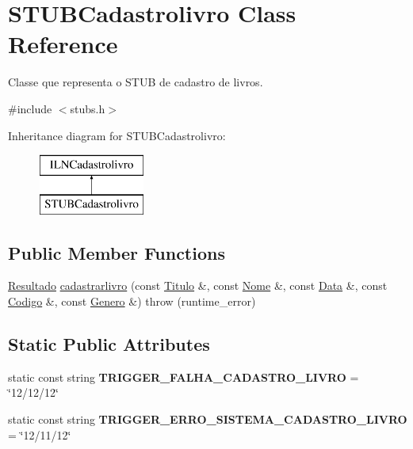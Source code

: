 \hypertarget{classSTUBCadastrolivro}{}\section{S\+T\+U\+B\+Cadastrolivro Class Reference}
\label{classSTUBCadastrolivro}


Classe que representa o S\+T\+UB de cadastro de livros.  




{\ttfamily \#include $<$stubs.\+h$>$}

Inheritance diagram for S\+T\+U\+B\+Cadastrolivro\+:\begin{figure}[H]
\begin{center}
\leavevmode
\includegraphics[height=2.000000cm]{classSTUBCadastrolivro}
\end{center}
\end{figure}
\subsection*{Public Member Functions}
\begin{DoxyCompactItemize}
\item 
\hyperlink{classResultado}{Resultado} \hyperlink{classSTUBCadastrolivro_ae0ef9f6f0a4ea7c397285b4a609bf07b}{cadastrarlivro} (const \hyperlink{classTitulo}{Titulo} \&, const \hyperlink{classNome}{Nome} \&, const \hyperlink{classData}{Data} \&, const \hyperlink{classCodigo}{Codigo} \&, const \hyperlink{classGenero}{Genero} \&)  throw (runtime\+\_\+error)
\end{DoxyCompactItemize}
\subsection*{Static Public Attributes}
\begin{DoxyCompactItemize}
\item 
\mbox{\label{classSTUBCadastrolivro_a2623ead55b1b8332c8c69291d5e1b49d}} 
static const string {\bfseries T\+R\+I\+G\+G\+E\+R\+\_\+\+F\+A\+L\+H\+A\+\_\+\+C\+A\+D\+A\+S\+T\+R\+O\+\_\+\+L\+I\+V\+RO} = \char`\"{}12/12/12\char`\"{}
\item 
\mbox{\label{classSTUBCadastrolivro_aa4536f549272d3878dc791211779353e}} 
static const string {\bfseries T\+R\+I\+G\+G\+E\+R\+\_\+\+E\+R\+R\+O\+\_\+\+S\+I\+S\+T\+E\+M\+A\+\_\+\+C\+A\+D\+A\+S\+T\+R\+O\+\_\+\+L\+I\+V\+RO} = \char`\"{}12/11/12\char`\"{}
\end{DoxyCompactItemize}


